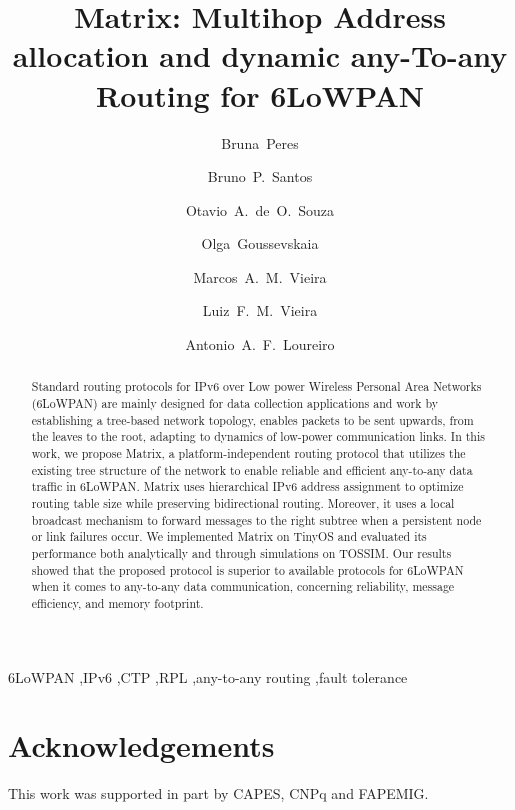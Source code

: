 \documentclass[final, 5p, times]{elsarticle}
\begin{document}
\begin{frontmatter}

\title{Matrix: Multihop Address allocation and dynamic any-To-any Routing for
6LoWPAN}

\author[ufmgaddress]{\mbox{Bruna Peres}}

\author[ufmgaddress]{\mbox{Bruno P. Santos}}

\author[ufmgaddress]{\mbox{Otavio A. de O. Souza}}


\author[ufmgaddress]{\mbox{Olga Goussevskaia}}

\author[ufmgaddress]{\mbox{Marcos A. M. Vieira}}

\author[ufmgaddress]{\mbox{Luiz F. M. Vieira}}

\author[ufmgaddress]{\mbox{Antonio A. F. Loureiro}}

\address[ufmgaddress]{Department of Computer Science, Universidade Federal de Minas Gerais (UFMG)\\ Av. Antonio Carlos 6627, Belo Horizonte, MG, Brazil.}



\begin{abstract}
Standard routing protocols for IPv6 over Low power Wireless Personal Area Networks (6LoWPAN) are mainly designed for data collection applications and work by establishing a tree-based network topology,  enables packets to be sent upwards, from the leaves to the root, adapting to dynamics of low-power communication links.
In this work, we propose Matrix, a platform-independent routing protocol that utilizes the existing tree structure of the network to enable reliable and efficient any-to-any data traffic in 6LoWPAN.
Matrix uses hierarchical IPv6 address assignment to
optimize routing table size while preserving bidirectional routing.
Moreover, it uses a local broadcast mechanism to forward messages to the right subtree when a persistent node or link failures occur. We
implemented Matrix on TinyOS and evaluated its performance both
analytically and through simulations on TOSSIM. Our results showed
that the proposed protocol is superior to available protocols for 6LoWPAN when it comes to any-to-any data communication, concerning reliability, message efficiency, and memory footprint.
\end{abstract}

\begin{keyword}
6LoWPAN \sep IPv6 \sep CTP \sep RPL \sep any-to-any routing \sep fault tolerance
\end{keyword}


\end{frontmatter}










\section*{Acknowledgements }
This work was supported in part by CAPES, CNPq and FAPEMIG.



\end{document}
